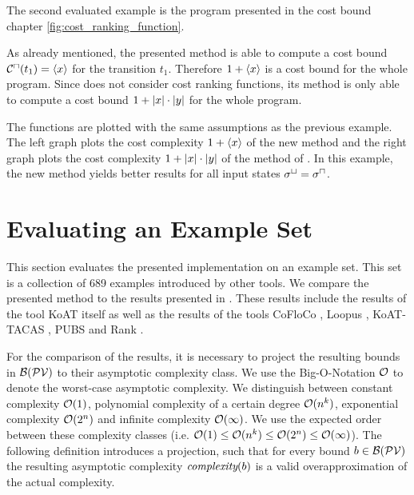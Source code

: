 The second evaluated example is the program presented in the cost bound chapter \ref{fig:cost_ranking_function}.



As already mentioned, the presented method is able to compute a cost bound ${\mathcal{C}^\sqcap}(t_1) = \left\langle x \right\rangle$ for the transition $t_1$.
Therefore $1 + \left\langle x \right\rangle$ is a cost bound for the whole program.
Since \cite{koat} does not consider cost ranking functions, its method is only able to compute a cost bound $1 + \left|x\right| \cdot \left|y\right|$ for the whole program.

The functions are plotted with the same assumptions as the previous example.
The left graph plots the cost complexity $1 + \left\langle x \right\rangle$ of the new method and the right graph plots the cost complexity $1 + \left|x\right| \cdot \left|y\right|$ of the method of \cite{koat}.
In this example, the new method yields better results for all input states ${\sigma^\sqcup} = {\sigma^\sqcap}$.

\section{Evaluating an Example Set}

This section evaluates the presented implementation on an example set.
This set is a collection of 689 examples introduced by other tools.
We compare the presented method to the results presented in \cite{koat}.
These results include the results of the tool KoAT itself as well as the results of the tools CoFloCo \cite{cofloco1, cofloco2}, Loopus \cite{loopus1, loopus2}, KoAT-TACAS \cite{leike2014ranking}, PUBS \cite{pubs1, pubs2} and Rank \cite{rank}.

For the comparison of the results, it is necessary to project the resulting bounds in $\mathcal{B}(\mathcal{PV})$ to their asymptotic complexity class.
We use the Big-O-Notation $\mathcal{O}$ \cite{bigo} to denote the worst-case asymptotic complexity.
We distinguish between constant complexity $\mathcal{O}(1)$, polynomial complexity of a certain degree $\mathcal{O}(n^k)$, exponential complexity $\mathcal{O}(2^n)$ and infinite complexity $\mathcal{O}(\infty)$.
We use the expected order between these complexity classes (i.e. $\mathcal{O}(1) \leq \mathcal{O}(n^k) \leq \mathcal{O}(2^n) \leq \mathcal{O}(\infty)$).
The following definition introduces a projection, such that for every bound $b \in \mathcal{B}(\mathcal{PV})$ the resulting asymptotic complexity $\emph{complexity}(b)$ is a valid overapproximation of the actual complexity.

